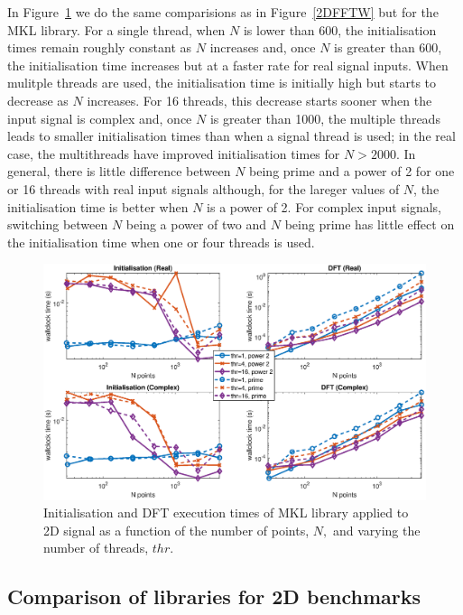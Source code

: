 \documentclass[a4paper]{article}
\begin{document}
In Figure~\ref{2DMKL} we do the same comparisions as in
Figure~\ref{2DFFTW} but for the MKL library. For a single thread, when
$N$ is lower than 600, the initialisation times remain roughly
constant as $N$ increases and, once $N$ is greater than 600, the
initialisation time increases but at a faster rate for real signal
inputs. When mulitple threads are used, the initialisation time is
initially high but starts to decrease as $N$ increases. For 16
threads, this decrease starts sooner when the input signal is complex
and, once $N$ is greater than 1000, the multiple threads leads to
smaller initialisation times than when a signal thread is used; in the
real case, the multithreads have improved initialisation times for
$N>2000.$ In general, there is little difference between $N$ being
prime and a power of 2 for one or 16 threads with real input signals
although, for the lareger values of $N$, the initialisation time is
better when $N$ is a power of 2. For complex input signals, switching
between $N$ being a power of two and $N$ being prime has little effect
on the initialisation time when one or four threads is used. 


\begin{figure}[htb]
    \centering
    \includegraphics[width=\linewidth]{../results/mkl_2d_thr.eps}
  \caption{Initialisation and DFT execution times of MKL library applied to 2D signal as a function of the
    number of points, $N,$ and varying the number of threads, $thr.$ }
  \label{2DMKL}
\end{figure}


\subsection{Comparison of libraries for 2D benchmarks}\label{Sec:2DComp}
\end{document}
